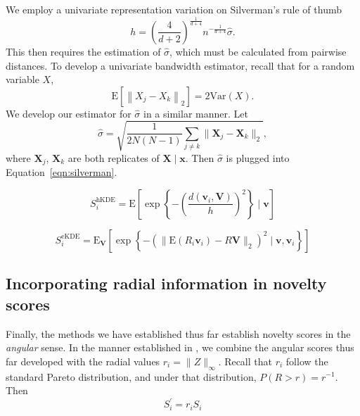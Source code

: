 We employ a univariate representation variation on Silverman's rule of thumb
  \begin{equation}
    \label{eqn:silverman}
    h = \left(\frac{4}{d+2}\right)^{\frac{1}{d+4}}n^{-\frac{1}{d+4}}\hat{\sigma}.
  \end{equation}
  This then requires the estimation of $\hat{\sigma}$, which must be calculated from pairwise 
  distances. To develop a univariate bandwidth estimator, recall that for a random variable $X$, 
  \[ \text{E}\left[\left\lVert X_j - X_k\right\rVert_2\right] = 2\text{Var}(X). \]
  We develop our estimator for $\hat{\sigma}$ in a similar manner.  Let
  \[
    \hat{\sigma} = \sqrt{\frac{1}{2N(N-1)}\sum_{j\neq k}\lVert \bm{X}_j - \bm{X}_k\rVert_2},
  \]
  where $\bm{X}_j$, $\bm{X}_k$ are both replicates of $\bm{X}\mid\bm{x}$. Then 
  $\hat{\sigma}$ is plugged into Equation~\ref{eqn:silverman}.
 
\begin{equation}
    \label{eqn:ad_kde_h}
    S_i^{\text{hKDE}} = \text{E}\left[\exp\left\lbrace -
    \left(\frac{d(\bm{v}_i,\bm{V})}{h}\right)^2\right\rbrace\mid\bm{v}\right]
\end{equation}

\begin{equation}
    \label{eqn:ad_kde_e}
    S_i^{\text{eKDE}} = \text{E}_{\bm{V}}\left[\exp\left\lbrace -\left(\lVert \text{E}(R_i\bm{v}_i) 
    - R\bm{V}\rVert_2\right)^2 \mid \bm{v},\bm{v}_i \right\rbrace\right]
\end{equation}

\subsection{Incorporating radial information in novelty scores}
Finally, the methods we have established thus far establish novelty scores in 
  the \emph{angular} sense.  In the manner established in \cite{goix2017}, we 
  combine the angular scores thus far developed with the radial values 
  $r_i = \lVert Z \rVert_{\infty}$.  Recall that $r_i$ follow the standard 
  Pareto distribution, and under that distribution, $P(R > r) = r^{-1}$.  Then
  \[
    S_i^{\prime} = r_iS_i
  \]
